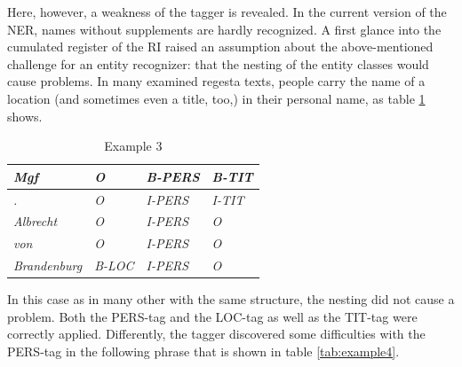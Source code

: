 \documentclass[11pt,a4paper]{article}
\begin{document}
Here, however, a weakness of the tagger is revealed. In the current version of the NER, names without supplements are hardly recognized. A first glance into the cumulated register of the RI raised an assumption about the above-mentioned challenge for an entity recognizer: that the nesting of the entity classes would cause problems. In many examined regesta texts, people carry the name of a location (and sometimes even a title, too,) in their personal name, as table \ref{tab:example3} shows.

\begin{table}
	\centering
	\begin{tabular}{l l l l}
		\textit{Mgf} & \textit{O} & \textit{\textcolor{customGreen}{B-PERS}} & \textit{\textcolor{customGreen}{B-TIT}}\\ \hline
		\textit{.} & \textit{O} & \textit{\textcolor{customGreen}{I-PERS}} & \textit{\textcolor{customGreen}{I-TIT}}\\ \hline
		\textit{Albrecht} & \textit{O} & \textit{\textcolor{customGreen}{I-PERS}} & \textit{O}\\ \hline
		\textit{von} & \textit{O} & \textit{\textcolor{customGreen}{I-PERS}} & \textit{O}\\ \hline
		\textit{Brandenburg} & \textit{\textcolor{customGreen}{B-LOC}} & \textit{\textcolor{customGreen}{I-PERS}} & \textit{O}\\ \hline
	\end{tabular}
	\caption{Example 3}
	\label{tab:example3}
\end{table}

In this case as in many other with the same structure, the nesting did not cause a problem. Both the PERS-tag and the LOC-tag as well as the TIT-tag were correctly applied. Differently, the tagger discovered some difficulties with the PERS-tag in the following phrase that is shown in table \ref{tab:example4}.
\end{document}
